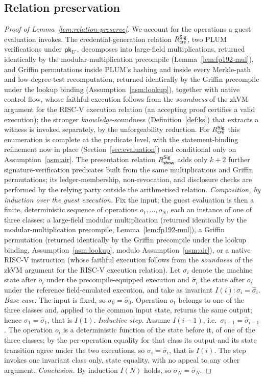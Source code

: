 \subsection{Relation preservation}\label{app:prsv-relation}
\begin{proof}[Proof of Lemma~\ref{lem:relation-preserve}]
We account for the operations a guest evaluation invokes. The credential-generation relation $R^{\mathsf{Sig}}_{\mathsf{cre}}$, two PLUM verifications under $\mathsf{pk}_U$, decomposes into large-field multiplications, returned identically by the modular-multiplication precompile (Lemma~\ref{lem:fp192-mul}), and Griffin permutations inside PLUM's hashing and inside every Merkle-path and low-degree-test recomputation, returned identically by the Griffin precompile under the lookup binding (Assumption~\ref{asm:lookup}), together with native control flow, whose faithful execution follows from the \emph{soundness} of the zkVM argument for the RISC-V execution relation (an accepting proof certifies a valid execution); the stronger \emph{knowledge}-soundness (Definition~\ref{def:ks}) that extracts a witness is invoked separately, by the unforgeability reduction. For $R^{\mathsf{Sig}}_{\mathsf{cre}}$ this enumeration is complete at the predicate level, with the statement-binding refinement now in place (Section~\ref{sec:evaluation}) and conditional only on Assumption~\ref{asm:air}. The presentation relation $R^{\mathsf{Sig}}_{\mathsf{show}}$ adds only $k+2$ further signature-verification predicates built from the same multiplications and Griffin permutations; its ledger-membership, non-revocation, and disclosure checks are performed by the relying party outside the arithmetised relation. \emph{Composition, by induction over the guest execution.} Fix the input; the guest evaluation is then a finite, deterministic sequence of operations $o_1,\dots,o_N$, each an instance of one of three classes: a large-field modular multiplication (returned identically by the modular-multiplication precompile, Lemma~\ref{lem:fp192-mul}), a Griffin permutation (returned identically by the Griffin precompile under the lookup binding, Assumption~\ref{asm:lookup}, modulo Assumption~\ref{asm:air}), or a native RISC-V instruction (whose faithful execution follows from the \emph{soundness} of the zkVM argument for the RISC-V execution relation). Let $\sigma_i$ denote the machine state after $o_i$ under the precompile-equipped execution and $\hat\sigma_i$ the state after $o_i$ under the reference field-emulated execution, and take as invariant $I(i): \sigma_i=\hat\sigma_i$. \emph{Base case.} The input is fixed, so $\sigma_0=\hat\sigma_0$. Operation $o_1$ belongs to one of the three classes and, applied to the common input state, returns the same output; hence $\sigma_1=\hat\sigma_1$, that is $I(1)$. \emph{Inductive step.} Assume $I(i-1)$, i.e.\ $\sigma_{i-1}=\hat\sigma_{i-1}$. The operation $o_i$ is a deterministic function of the state before it, of one of the three classes; by the per-operation equality for that class its output and its state transition agree under the two executions, so $\sigma_i=\hat\sigma_i$, that is $I(i)$. The step invokes one invariant class only, state equality, with no appeal to any other argument. \emph{Conclusion.} By induction $I(N)$ holds, so $\sigma_N=\hat\sigma_N$. 
\end{proof}

